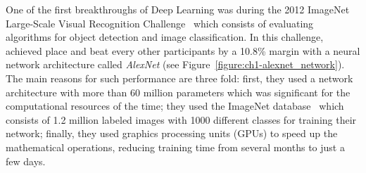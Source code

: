 One of the first breakthroughs of Deep Learning was during the 2012 ImageNet Large-Scale Visual Recognition Challenge~\cite{ILSVRC15} which consists of evaluating algorithms for object detection and image classification.
In this challenge, \citet{krizhevsky2012imagenet} achieved  place and beat every other participants by a 10.8\% margin with a neural network architecture called \emph{AlexNet} (see Figure~\ref{figure:ch1-alexnet_network}). 
The main reasons for such performance are three fold: first, they used a network architecture with more than 60 million parameters which was significant for the computational resources of the time; they used the ImageNet database~\cite{deng2009imagenet} which consists of 1.2 million labeled images with 1000 different classes for training their network; finally, they used graphics processing units (GPUs) to speed up the mathematical operations, reducing training time from several months to just a few days. 

